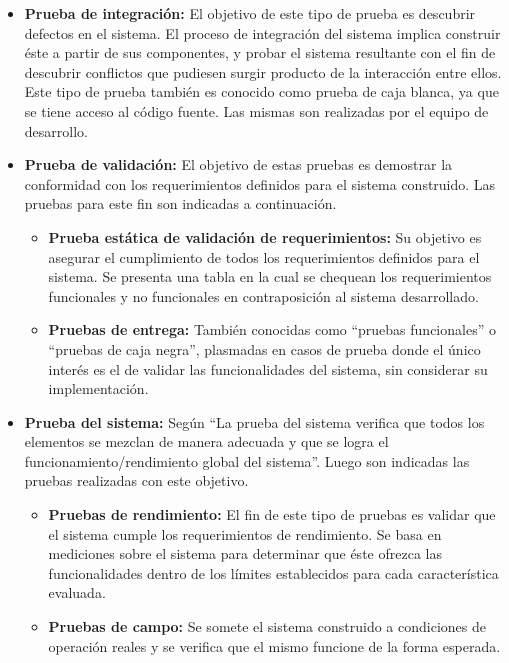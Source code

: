 \begin{itemize}
    \item{\textbf{Prueba de integración:}} El objetivo de este tipo de prueba es descubrir defectos en el sistema. El proceso de integración del sistema implica construir éste a partir de sus componentes, y probar el sistema resultante con el fin de descubrir conflictos que pudiesen surgir producto de la interacción entre ellos. Este tipo de prueba también es conocido como prueba de caja blanca, ya que se tiene acceso al código fuente. Las mismas son realizadas por el equipo de desarrollo.
    
    \item{\textbf{Prueba de validación:}} El objetivo de estas pruebas es demostrar la conformidad con los requerimientos definidos para el sistema construido. Las pruebas para este fin son indicadas a continuación. 
    
        \begin{itemize}
            \item{\textbf{Prueba estática de validación de requerimientos:}} Su objetivo es asegurar el cumplimiento de todos los requerimientos definidos para el sistema. Se presenta una tabla en la cual se chequean los requerimientos funcionales y no funcionales en contraposición al sistema desarrollado.
            \item{\textbf{Pruebas de entrega:}} También conocidas como “pruebas funcionales” o “pruebas de caja negra”, plasmadas en casos de prueba donde el único interés es el de validar las funcionalidades del sistema, sin considerar su implementación.
        \end{itemize}
        
    \item{\textbf{Prueba del sistema:}} Según \cite{Press10} ``La prueba del sistema verifica que todos los elementos se mezclan de manera adecuada y que se logra el funcionamiento/rendimiento global del sistema''. Luego son indicadas las pruebas realizadas con este objetivo.
        \begin{itemize}
            \item{\textbf{Pruebas de rendimiento:}} El fin de este tipo de pruebas es validar que el sistema cumple los requerimientos de rendimiento. Se basa en mediciones sobre el sistema para determinar que éste ofrezca las funcionalidades dentro de los límites establecidos para cada característica evaluada.
            \item{\textbf{Pruebas de campo:}} Se somete el sistema construido a condiciones de operación reales y se verifica que el mismo funcione de la forma esperada.
        \end{itemize}
\end{itemize}

